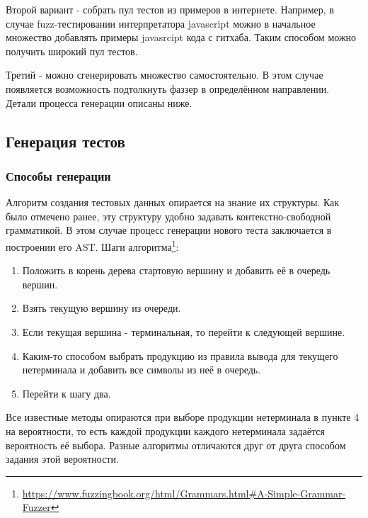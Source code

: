 \documentclass[a4paper]{article}
\begin{document}
Второй вариант - собрать пул тестов из примеров в интернете. Например, в случае fuzz-тестировании интерпретатора javascript можно в начальное множество добавлять примеры javasrcipt кода с гитхаба. Таким способом можно получить широкий пул тестов.
\indent

Третий - можно сгенерировать множество самостоятельно. В этом случае появляется возможность подтолкнуть фаззер в определённом направлении. Детали процесса генерации описаны ниже.

\subsection{Генерация тестов}
\indent

\subsubsection{Способы генерации}
\indent

Алгоритм создания тестовых данных опирается на знание их структуры. Как было отмечено ранее, эту структуру удобно задавать контекстно-свободной грамматикой. В этом случае процесс генерации нового теста заключается в построении его AST. Шаги алгоритма\footnote[1]{\href{https://www.fuzzingbook.org/html/Grammars.html\#A-Simple-Grammar-Fuzzer}{https://www.fuzzingbook.org/html/Grammars.html\#A-Simple-Grammar-Fuzzer}}:

\begin{enumerate}
    \item Положить в корень дерева стартовую вершину и добавить её в очередь вершин.
    \item Взять текущую вершину из очереди.
    \item Если текущая вершина - терминальная, то перейти к следующей вершине.
    \item Каким-то способом выбрать продукцию из правила вывода для текущего нетерминала и добавить все символы из неё в очередь.
    \item Перейти к шагу два.
\end{enumerate}

Все известные методы опираются при выборе продукции нетерминала в пункте 4 на вероятности, то есть каждой продукции каждого нетерминала задаётся вероятность её выбора. Разные алгоритмы отличаются друг от друга способом задания этой вероятности. 
\end{document}
